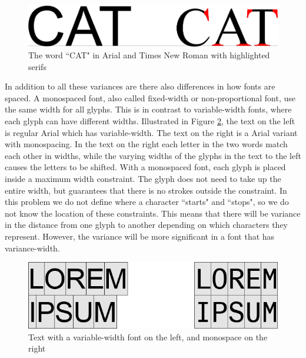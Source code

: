 \begin{figure}[ht]
    \centering
    \includegraphics[width=1.0\textwidth]{fig/chapter2/typeface_comparison.png}
    \caption{The word ``CAT" in Arial and Times New Roman with highlighted serifs}
    \label{fig:typeface-comparison}
\end{figure}

In addition to all these variances are there also differences in how fonts are spaced. A monospaced font, also called fixed-width or non-proportional font, use the same width for all glyphs. This is in contrast to variable-width fonts, where each glyph can have different widths. Illustrated in Figure \ref{fig:regular-mono-comparison}, the text on the left is regular Arial which has variable-width. The text on the right is a Arial variant with monospacing. In the text on the right each letter in the two words match each other in widths, while the varying widths of the glyphs in the text to the left causes the letters to be shifted. With a monospaced font, each glyph is placed inside a maximum width constraint. The glyph does not need to take up the entire width, but guarantees that there is no strokes outside the constraint. In this problem we do not define where a character ``starts" and ``stops", so we do not know the location of these constraints. This means that there will be variance in the distance from one glyph to another depending on which characters they represent. However, the variance will be more significant in a font that has variance-width. 

\begin{figure}[ht]
    \centering
    \includegraphics[width=1.0\textwidth]{fig/chapter2/regular_mono_comparison.png}
    \caption{Text with a variable-width font on the left, and monospace on the right}
    \label{fig:regular-mono-comparison}
\end{figure}


